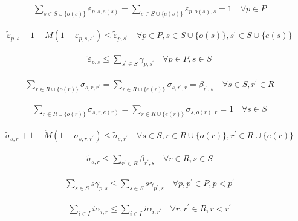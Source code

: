 \documentclass[10pt]{article}
\begin{document}
\[\begin{aligned}& \sum_{s \in S \cup \{o(s)\}} \varepsilon_{p, s, e(s)} = \sum_{s \in S \cup \{e(s)\}} \varepsilon_{p, o(s), s} = 1 \quad \forall p \in P\end{aligned}\]

\[\begin{aligned}& \tilde{\varepsilon}_{p, s} + 1 - \dot{M}(1 - \varepsilon_{p, s, s^{\prime}}) \le \tilde{\varepsilon}_{p, s^{\prime}} \quad \forall p \in P, s \in S \cup \{o(s)\}, s^{\prime} \in S \cup \{e(s)\}\end{aligned}\]

\[\begin{aligned}& \tilde{\varepsilon}_{p, s} \le \sum_{s^{\prime} \in S} \gamma_{p, s^{\prime}} \quad \forall p \in P, s \in S\end{aligned}\]

\[\begin{aligned}& \sum_{r \in R \cup \{o(r)\}} \sigma_{s, r, r^{\prime}} = \sum_{r \in R \cup \{e(r)\}} \sigma_{s, r^{\prime}, r} = \beta_{r^{\prime}, s} \quad \forall s \in S, r^{\prime} \in R\end{aligned}\]

\[\begin{aligned}& \sum_{r \in R \cup \{o(r)\}} \sigma_{s, r, e(r)} = \sum_{r \in R \cup \{e(r)\}} \sigma_{s, o(r), r} = 1 \quad \forall s \in S\end{aligned}\]

\[\begin{aligned}& \tilde{\sigma}_{s, r} + 1 - \ddot{M}(1 - \sigma_{s, r, r^{\prime}}) \le \tilde{\sigma}_{s, r^{\prime}} \quad \forall s \in S, r \in R \cup \{o(r)\}, r^{\prime} \in R \cup \{e(r)\}\end{aligned}\]

\[\begin{aligned}& \tilde{\sigma}_{s, r} \le \sum_{r^{\prime} \in R} \beta_{r^{\prime}, s} \quad \forall r \in R, s \in S\end{aligned}\]

\[\begin{aligned}& \sum_{s \in S} s \gamma_{p, s} \le \sum_{s \in S} s \gamma_{p^{\prime}, s} \quad \forall p, p^{\prime} \in P, p < p^{\prime}\end{aligned}\]

\[\begin{aligned}& \sum_{i \in I} i \alpha_{i, r} \le \sum_{i \in I} i \alpha_{i, r^{\prime}} \quad \forall r, r^{\prime} \in R, r < r^{\prime}\end{aligned}\]
\end{document}
